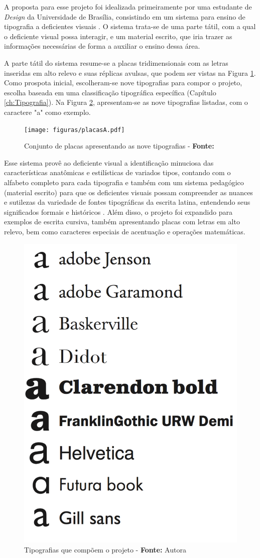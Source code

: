 A proposta para esse projeto foi idealizada primeiramente por uma estudante de \textit{Design} da Universidade de Brasília, consistindo em um sistema para ensino de tipografia a deficientes visuais . O sistema trata-se de uma parte tátil, com a qual o deficiente visual possa interagir, e um material escrito, que iria trazer as informações necessárias de forma a auxiliar o ensino dessa área.

A parte tátil do sistema resume-se a placas tridimensionais com as letras inseridas em alto relevo e suas réplicas avulsas, que podem ser vistas na Figura \ref{fig:placas}. Como prospota inicial, escolheram-se nove tipografias para compor o projeto, escolha baseada em uma classificação tipográfica específica (Capítulo \ref{ch:Tipografia}). Na Figura \ref{fig:tipografias}, apresentam-se as nove tipografias listadas, com o caractere "a" { } como exemplo.

\begin{figure}[H]
 \centering
  \texttt{[image: figuras/placasA.pdf]}
  \caption{Conjunto de placas apresentando as nove tipografias - \textbf{Fonte:} }
  \label{fig:placas}
\end{figure}

Esse sistema provê ao deficiente visual a identificação minuciosa das características anatômicas e estilísticas de variados tipos, contando com o alfabeto completo para cada tipografia e também com um sistema pedagógico (material escrito) para que os deficientes visuais possam compreender as nuances e sutilezas da variedade de fontes tipográficas da escrita latina, entendendo seus significados formais e históricos  . Além disso, o projeto foi expandido para exemplos de escrita cursiva, também apresentando placas com letras em alto relevo, bem como caracteres especiais de acentuação e operações matemáticas.

\begin{figure}[H]
 \centering
  \includegraphics[width=0.4\linewidth]{figuras/tipografias.pdf}
  \caption{Tipografias que compõem o projeto - \textbf{Fonte:} Autora}
  \label{fig:tipografias}
\end{figure}


